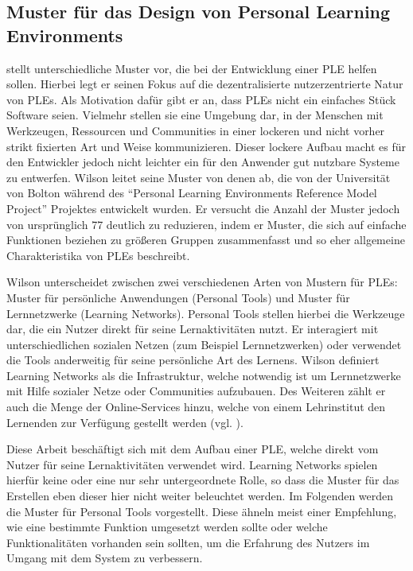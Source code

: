 \subsection{Muster für das Design von Personal Learning Environments}\label{section:wilson_patterns}
\cite{Wilson2008} stellt unterschiedliche Muster vor, die bei der Entwicklung einer PLE helfen sollen. Hierbei legt er seinen Fokus auf die dezentralisierte  nutzerzentrierte Natur von PLEs. Als Motivation dafür gibt er an, dass PLEs nicht ein einfaches Stück Software seien. Vielmehr stellen sie eine Umgebung dar, in der Menschen mit Werkzeugen, Ressourcen und Communities in einer lockeren und nicht vorher strikt fixierten Art und Weise kommunizieren. Dieser lockere Aufbau macht es für den Entwickler jedoch nicht leichter ein für den Anwender gut nutzbare Systeme zu entwerfen. Wilson leitet seine Muster von denen ab, die von der Universität von Bolton während des "`Personal Learning Environments Reference Model Project"' Projektes entwickelt wurden. Er versucht die Anzahl der Muster jedoch von ursprünglich 77 deutlich zu reduzieren, indem er Muster, die sich auf einfache Funktionen beziehen zu größeren Gruppen zusammenfasst und so eher allgemeine Charakteristika von PLEs beschreibt.

Wilson unterscheidet zwischen zwei verschiedenen Arten von Mustern für PLEs: Muster für persönliche Anwendungen (Personal Tools) und Muster für Lernnetzwerke (Learning Networks). Personal Tools stellen hierbei die Werkzeuge dar, die ein Nutzer direkt für seine Lernaktivitäten nutzt. Er interagiert mit unterschiedlichen sozialen Netzen (zum Beispiel Lernnetzwerken) oder verwendet die Tools anderweitig für seine persönliche Art des Lernens. 
Wilson definiert Learning Networks als die Infrastruktur, welche notwendig ist um Lernnetzwerke mit Hilfe sozialer Netze oder Communities aufzubauen. Des Weiteren zählt er auch die Menge der Online-Services hinzu, welche von einem Lehrinstitut den Lernenden zur Verfügung gestellt werden (vgl. \cite{Wilson2008}).

Diese Arbeit beschäftigt sich mit dem Aufbau einer PLE, welche direkt vom Nutzer für seine Lernaktivitäten verwendet wird. Learning Networks spielen hierfür keine oder eine nur sehr untergeordnete Rolle, so dass die Muster für das Erstellen eben dieser hier nicht weiter beleuchtet werden. Im Folgenden werden die Muster für Personal Tools vorgestellt. Diese ähneln meist einer Empfehlung, wie eine bestimmte Funktion umgesetzt werden sollte oder welche Funktionalitäten vorhanden sein sollten, um die Erfahrung des Nutzers im Umgang mit dem System zu verbessern.

